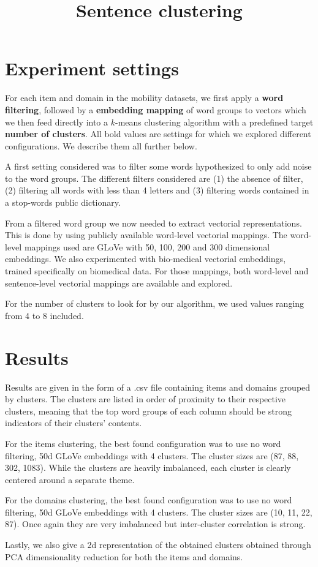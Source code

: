 \documentclass{article}
\title{Sentence clustering}
\date{}
\begin{document}
\maketitle

\section*{Experiment settings}

For each item and domain in the mobility datasets, we first apply a \textbf{word filtering}, 
followed by a \textbf{embedding mapping} of word groups to vectors which we then feed 
directly into a $k$-means clustering algorithm with a predefined target \textbf{number of
clusters}. All bold values are settings for which we explored different configurations.
We describe them all further below.

A first setting considered was to filter some words hypothesized 
to only add noise to the word groups. The different filters considered are (1) the absence
of filter, (2) filtering all words with less than 4 letters and (3) filtering words contained
in a stop-words public dictionary.

From a filtered word group we now needed to extract vectorial representations. This is done 
by using publicly available word-level vectorial mappings. The word-level mappings used 
are GLoVe with 50, 100, 200 and 300 dimensional embeddings. We also experimented with 
bio-medical vectorial embeddings, trained specifically on biomedical data. For those
mappings, both word-level and sentence-level vectorial mappings are available and explored.

For the number of clusters to look for by our algorithm, we used values ranging from 4 to 8 
included.


\section*{Results}

Results are given in the form of a .csv file containing items and domains grouped by clusters.
The clusters are listed in order of proximity to their respective clusters, meaning that
the top word groups of each column should be strong indicators of their clusters' contents.

For the items clustering, the best found configuration was to use no word filtering, 50d
GLoVe embeddings with 4 clusters. The cluster sizes are (87, 88, 302, 1083). While the 
clusters are heavily imbalanced, each cluster is clearly centered around a separate theme.

For the domains clustering, the best found configuration was to use no word filtering, 50d
GLoVe embeddings with 4 clusters. The cluster sizes are (10, 11, 22, 87). Once again they
are very imbalanced but inter-cluster correlation is strong.

Lastly, we also give a 2d representation of the obtained clusters obtained
through PCA dimensionality reduction for both the items and domains.
\end{document}
